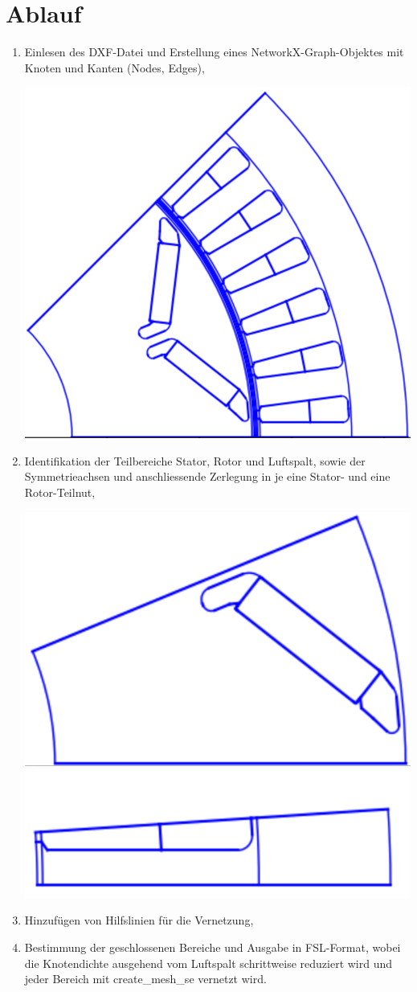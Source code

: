 \documentclass[10pt, a4paper,german]{scrartcl}
\begin{document}
\section{Ablauf}
\begin{enumerate}
\item
  Einlesen des DXF-Datei und Erstellung eines NetworkX-Graph-Objektes mit Knoten und Kanten (Nodes, Edges),
\begin{center}  
\includegraphics[width=0.45\linewidth]{step1} 
\end{center}
\item Identifikation der Teilbereiche Stator, Rotor und Luftspalt, sowie der Symmetrieachsen und anschliessende
  Zerlegung in je eine Stator- und eine Rotor-Teilnut, %
  
\includegraphics[width=0.45\linewidth]{step2}\hfill 
\includegraphics[width=0.45\linewidth]{step4} 
\item
  Hinzufügen von Hilfslinien für die Vernetzung,
\item
  Bestimmung der geschlossenen Bereiche und Ausgabe in FSL-Format, wobei die Knotendichte ausgehend vom
  Luftspalt schrittweise reduziert wird und jeder Bereich mit create\_mesh\_se vernetzt wird. 
\end{enumerate}
\end{document}
